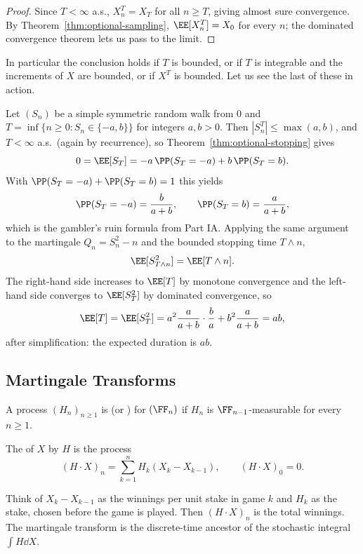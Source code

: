 \begin{proof}
	Since $T<\infty$ a.s., $X_n^T = X_T$ for all $n \geq T$, giving almost sure convergence. By Theorem~\ref{thm:optional-sampling}, $\EE[X_n^T] = X_0$ for every $n$; the dominated convergence theorem lets us pass to the limit.
\end{proof}

In particular the conclusion holds if $T$ is bounded, or if $T$ is integrable and the increments of $X$ are bounded, or if $X^T$ is bounded. Let us see the last of these in action.

\begin{example}
	Let $(S_n)$ be a simple symmetric random walk from $0$ and $T = \inf\{n \geq 0: S_n \in \{-a,b\}\}$ for integers $a,b>0$. Then $|S_n^T|\leq \max(a,b)$, and $T<\infty$ a.s.\ (again by recurrence), so Theorem~\ref{thm:optional-stopping} gives
	$$
	0 = \EE[S_T] = -a\,\PP(S_T = -a) + b\,\PP(S_T = b).
	$$
	With $\PP(S_T=-a)+\PP(S_T=b)=1$ this yields
	$$
	\PP(S_T = -a) = \frac{b}{a+b},\qquad \PP(S_T = b) = \frac{a}{a+b},
	$$
	which is the gambler's ruin formula from Part IA. Applying the same argument to the martingale $Q_n = S_n^2 - n$ and the bounded stopping time $T\wedge n$,
	$$
	\EE[S^2_{T\wedge n}] = \EE[T \wedge n].
	$$
	The right-hand side increases to $\EE[T]$ by monotone convergence and the left-hand side converges to $\EE[S_T^2]$ by dominated convergence, so
	$$
	\EE[T] = \EE[S_T^2] = a^2\frac{a}{a+b}\cdot\frac{b}{a} + b^2 \frac{a}{a+b} = ab,
	$$
	after simplification: the expected duration is $ab$.
\end{example}

\subsection{Martingale Transforms}

\begin{definition}
	A process $(H_n)_{n\geq1}$ is  (or ) for $(\FF_n)$ if $H_n$ is $\FF_{n-1}$-measurable for every $n \geq 1$.
\end{definition}

\begin{definition}
	The  of $X$ by $H$ is the process
	$$
	(H\cdot X)_n = \sum_{k=1}^n H_k(X_k - X_{k-1}), \qquad (H\cdot X)_0 = 0.
	$$
\end{definition}

Think of $X_k - X_{k-1}$ as the winnings per unit stake in game $k$ and $H_k$ as the stake, chosen before the game is played. Then $(H\cdot X)_n$ is the total winnings. The martingale transform is the discrete-time ancestor of the stochastic integral $\int H \dd X$.

